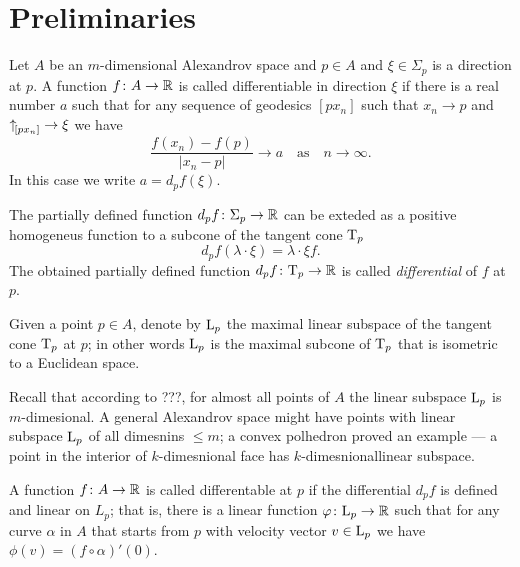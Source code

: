 \section{Preliminaries}

Let $A$ be an $m$-dimensional Alexandrov space and $p\in A$ and $\xi\in\Sigma_p$ is a direction at $p$.
A function $f\colon A\to \mathbb{R}$ is called differentiable in direction $\xi$ if there is a real number $a$ such that for any sequence of geodesics $[px_n]$ such that $x_n\to p$ and ${\uparrow}_{\hskip-0.15em[{p}{x_n}]}{}\to \xi$ we have
\[\frac{f(x_n)-f(p)}{|x_n-p|}\to a\quad\text{as}\quad n\to\infty.\]
In this case we write $a=d_pf(\xi)$.

The partially defined function $d_pf\colon\Sigma_p\to\mathbb{R}$ can be exteded as a positive homogeneus function to a subcone of the tangent cone $\text{\rm T}_p$
\[d_pf(\lambda\cdot\xi)=\lambda\cdot\xi f.\]
The obtained partially defined function $d_pf\colon\text{\rm T}_p\to\mathbb{R}$ is called \emph{differential} of $f$ at $p$.

Given a point $p\in A$, denote by $\text{\rm L}_p$ the maximal linear subspace of the tangent cone $\text{\rm T}_p$ at $p$;
in other words $\text{\rm L}_p$ is the maximal subcone of $\text{\rm T}_p$ that is isometric to a Euclidean space.

Recall that according to ???, for almost all points of $A$ the linear subspace $\text{\rm L}_p$ is $m$-dimesional.
A general Alexandrov space might have points with linear subspace $\text{\rm L}_p$ of all dimesnins $\le m$;
a convex polhedron proved an example --- a point in the interior of $k$-dimesnional face has $k$-dimesnionallinear subspace.


A function $f\colon A\to\mathbb{R}$ is called differentable at $p$ if the differential $d_pf$ is defined and linear on $L_p$;
that is, there is a linear function $\varphi\colon\text{\rm L}_p\to \mathbb{R}$ such that for any curve $\alpha$ in $A$ that starts from $p$ with velocity vector $v\in \text{\rm L}_p$ we have $\phi(v)=(f\circ\alpha)'(0)$.


